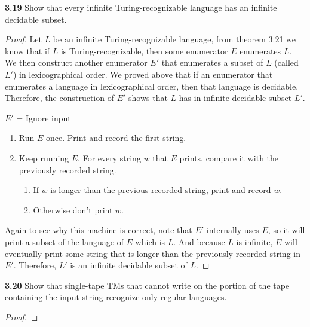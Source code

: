 \textbf{3.19} Show that every infinite Turing-recognizable language has an infinite decidable subset.
\begin{mdframed}
\begin{proof}
Let $L$ be an infinite Turing-recognizable language, from theorem 3.21 we know that if $L$ is Turing-recognizable, then some enumerator $E$ enumerates $L$. We then construct another enumerator $E'$ that enumerates a subset of $L$ (called $L'$) in lexicographical order. We proved above that if an enumerator that enumerates a language in lexicographical order, then that language is decidable. Therefore, the construction of $E'$ shows that $L$ has in infinite decidable subset $L'$.

\medskip
$E'$ = Ignore input
\begin{enumerate}
\item Run $E$ once. Print and record the first string.
\item Keep running $E$. For every string $w$ that $E$ prints, compare it with the previously recorded string.
\begin{enumerate}
\item If $w$ is longer than the previous recorded string, print and record $w$.
\item Otherwise don't print $w$.
\end{enumerate}
\end{enumerate}

Again to see why this machine is correct, note that $E'$ internally uses $E$, so it will print a subset of the language of $E$ which is $L$. And because $L$ is infinite, $E$ will eventually print some string that is longer than the previously recorded string in $E'$. Therefore, $L'$ is an infinite decidable subset of $L$.
\end{proof}
\end{mdframed}

\textbf{3.20} Show that single-tape TMs that cannot write on the portion of the tape containing the input string recognize only regular languages.

\begin{mdframed}
\begin{proof}

\end{proof}
\end{mdframed}
